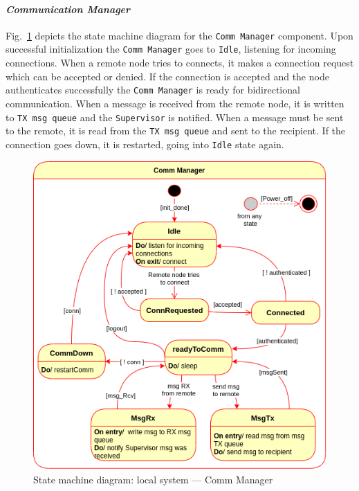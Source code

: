 \paragraph{\emph{Communication Manager}}
Fig.~\ref{fig:state-mach-local-comm} depicts the state machine diagram for the
\texttt{Comm Manager} component. Upon successful initialization the
\texttt{Comm Manager} goes to \texttt{Idle}, listening for incoming
connections. When a remote node tries to connects, it makes a connection request
which can be accepted or denied. If the connection is accepted and the node
authenticates successfully the \texttt{Comm Manager} is ready for bidirectional
communication. When a message is received from the remote node, it is written to
\texttt{TX msg queue} and the \texttt{Supervisor} is notified. When a message
must be sent to the remote, it is read from the \texttt{TX msg queue} and sent
to the recipient. If the connection goes down, it is restarted, going into
\texttt{Idle} state again.
%
\begin{figure}[htb!]
\centering
    \includegraphics[width=0.6\columnwidth]{./img/state-mach-local-comm.png}
  \caption{State machine diagram: local system --- Comm Manager}%
\label{fig:state-mach-local-comm}
\end{figure}
%
%
